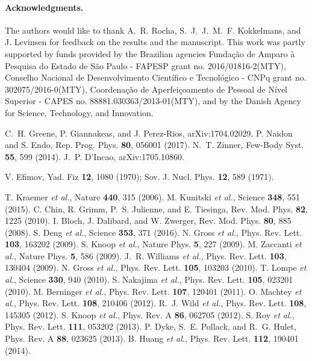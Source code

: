 \documentclass[twocolumn,showpacs,aps,prl,10pt]{revtex4}
\begin{document}
\paragraph*{Acknowledgments.} 
The authors would like to thank A.~R. Rocha, S.~J.~J.~M.~F. Kokkelmans, 
and J. Levinsen for feedback on the results and the manuscript.
This work was partly supported by funds 
provided by the Brazilian agencies Funda\c{c}\~{a}o de Amparo \`{a} 
Pesquisa do Estado de S\~{a}o Paulo - FAPESP grant no. 2016/01816-2(MTY), 
Conselho Nacional de Desenvolvimento Cient\'{i}fico e Tecnol\'{o}gico - CNPq 
grant no. 302075/2016-0(MTY), Coordena\c{c}\~{a}o de Aperfei\c{c}oamento 
de Pessoal de N\'{i}vel Superior - CAPES no. 88881.030363/2013-01(MTY), 
and by the Danish Agency for Science, Technology, and Innovation.


\begin{thebibliography}{99}

 C.~H. Greene, P. Giannakeas, and J. Perez-Rios, arXiv:1704.02029.
 P. Naidon and S. Endo, Rep. Prog. Phys. {\bf 80}, 056001 (2017).
 N.~T. Zinner, Few-Body Syst. {\bf 55}, 599 (2014).
 J.~P. D'Incao, arXiv:1705.10860.

 V. Efimov, Yad. Fiz \textbf{12}, 1080 (1970); Sov. J. Nucl. Phys. \textbf{12}, 589 (1971).

 T. Kraemer {\it et al.}, Nature {\bf 440}, 315 (2006).
 M. Kunitski {\it et al.}, Science {\bf 348}, 551 (2015).
 C. Chin, R. Grimm, P.~S. Julienne, and E. Tiesinga, Rev. Mod. Phys. {\bf 82}, 1225 (2010).
 I. Bloch, J. Dalibard, and W. Zwerger, Rev. Mod. Phys. {\bf 80}, 885 (2008).
 S. Deng {\it et al.}, Science {\bf 353}, 371 (2016).
 N. Gross {\it et al.}, Phys. Rev. Lett. {\bf 103}, 163202 (2009).
 S. Knoop {\it et al.}, Nature Phys. {\bf 5}, 227 (2009).
 M. Zaccanti {\it et al.}, Nature Phys. {\bf 5}, 586 (2009).
 J.~R. Williams {\it et al.}, Phys. Rev. Lett. {\bf 103}, 130404 (2009).
 N. Gross {\it et al.}, Phys. Rev. Lett. {\bf 105}, 103203 (2010).
 T. Lompe {\it et al.}, Science {\bf 330}, 940 (2010).
 S. Nakajima {\it et al.}, Phys. Rev. Lett. {\bf 105}, 023201 (2010).
 M. Berninger {\it et al.}, Phys. Rev. Lett. {\bf 107}, 120401 (2011).
 O. Machtey {\it et al.}, Phys. Rev. Lett. {\bf 108}, 210406 (2012).
 R.~J. Wild {\it et al.}, Phys. Rev. Lett. {\bf 108}, 145305 (2012).
 S. Knoop {\it et al.}, Phys. Rev. A {\bf 86}, 062705 (2012).
 S. Roy {\it et al.}, Phys. Rev. Lett. {\bf 111}, 053202 (2013).
 P. Dyke, S.~E. Pollack, and R.~G. Hulet, Phys. Rev. A {\bf 88}, 023625 (2013).
 B. Huang {\it et al.}, Phys. Rev. Lett. {\bf 112}, 190401 (2014).


\end{thebibliography}
\end{document}
